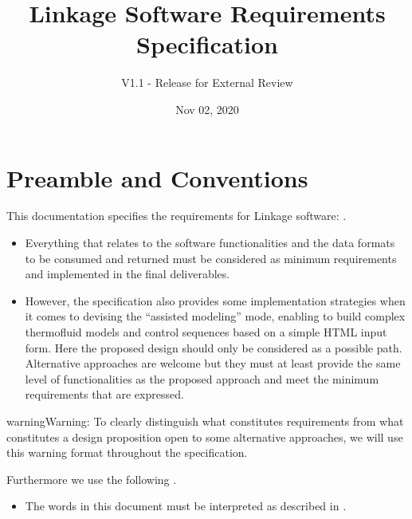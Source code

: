 \documentclass[letterpaper,10pt, openany,english]{sphinxmanual}
\title{Linkage Software Requirements Specification}
\date{Nov 02, 2020}
\author{V1.1 - Release for External Review}
\begin{document}
\pagestyle{empty}
\sphinxmaketitle
\pagestyle{plain}
\sphinxtableofcontents
\pagestyle{normal}
\label{\detokenize{index::doc}}




\pagestyle{plain}


\chapter{Preamble and Conventions}
\label{\detokenize{preamble:preamble-and-conventions}}\label{\detokenize{preamble::doc}}
This documentation specifies the requirements for Linkage software: .
\begin{itemize}
\item {} 
Everything that relates to the software functionalities and the data formats to be consumed and returned must be considered as minimum requirements and implemented in the final deliverables.

\item {} 
However, the specification also provides some implementation strategies when it comes to devising the “assisted modeling” mode, enabling to build complex thermo\sphinxhyphen{}fluid models and control sequences based on a simple HTML input form. Here the proposed design should only be considered as a possible path. Alternative approaches are welcome but they must at least provide the same level of functionalities as the proposed approach and meet the minimum requirements that are expressed.

\end{itemize}

\begin{sphinxadmonition}{warning}{Warning:}
To clearly distinguish what constitutes requirements from what constitutes a design proposition open to some alternative approaches, we will use this warning format throughout the specification.

Furthermore we use the following .
\begin{itemize}
\item {} 
The words  in this document must be interpreted as described in .

\end{itemize}
\end{sphinxadmonition}
\end{document}
